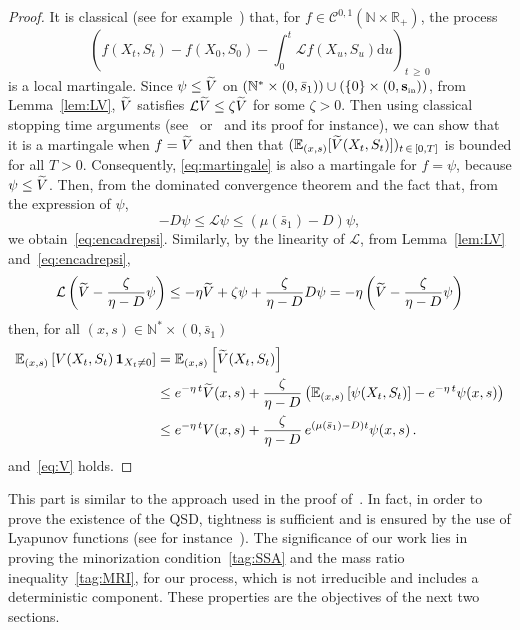\documentclass[10pt]{amsart}
\theoremstyle{definition}\newtheorem{defi}[theo]{Definition}\newtheorem{rema}[theo]{Remark}\newtheorem{exam}[theo]{Example}\newtheorem{exem}[theo]{Example}\newtheorem{nota}[theo]{Notation}
\newcommand{\RR}{\mathbb{R}}
\newcommand{\NN}{\mathbb{N}}
\newcommand{\EE}{\mathbb{E}}
\newcommand{\clL}{\mathcal{L}}
\newcommand{\clC}{\mathcal{C}}
\newcommand{\Sin}{{\mathbf s}_{\textrm{\tiny\rm in}}}
\newcommand{\dif}{\mathrm{d}}
\newcommand{\1}{\mathbf{1}}
\let\oldtilde\tilde
\renewcommand*{\tilde}[1]{\mathchoice{\widetilde{#1}}{\widetilde{#1}}{\oldtilde{#1}}{\oldtilde{#1}}}
\begin{document}
\begin{proof}
It is classical (see for example~\cite[Section~4]{CF15}) that, for $f\in\clC^{0,1}(\NN\times \RR_+)$, the process
\begin{equation}\label{eq:martingale}
\left(f(X_t,S_t) - f(X_0,S_0) - \int_0^t \clL f(X_u,S_u) \dif u \right)_{t\,\geq\,0}
\end{equation}
is a local martingale. Since $\psi \leq \tilde V$ on $(\NN^*\times(0,\bar s_1)) \cup(\{0\}\times (0,\Sin))$, from Lemma~\ref{lem:LV}, $\tilde V$ satisfies $\clL\tilde V\leq \zeta \tilde V $ for some $\zeta>0$. Then using classical stopping time arguments (see~\cite[Section~6.2.]{BCGM} or~\cite[Theorem~2.1]{MTIII} and its proof for instance), we can show that it is a martingale when $f=\tilde V$ and then that $(\EE_{(x,s)}[\tilde V(X_t,S_t)])_{t\,\in\,[0,T]}$ is bounded for all $T>0$. Consequently, \eqref{eq:martingale} is also a martingale for $f=\psi$, because $\psi \leq \tilde V$. Then, from the dominated convergence theorem and the fact that, from the expression of $\psi$,
\[
-D \psi \leq \clL \psi \leq (\mu(\bar s_1) -D)\psi,
\]
we obtain~\eqref{eq:encadrepsi}. Similarly, by the linearity of $\clL$, from Lemma~\ref{lem:LV} and~\eqref{eq:encadrepsi},
\[
\clL\left(\tilde V-\frac{\zeta}{\eta-D}\psi\right)
\leq -\eta \tilde V + \zeta \psi + \frac{\zeta}{\eta-D}D\psi = -\eta\left(\tilde V-\frac{\zeta}{\eta-D}\psi\right)
\]
then, for all $(x,s)\in \NN^*\times (0,\bar s_1)$
\begin{align*}
\EE_{(x,s)}\left[V(X_t,S_t) \, \1_{X_t\neq 0}\right] &= \EE_{(x,s)}\left[\tilde V(X_t,S_t)\right]
\\
&\leq e^{-\eta\,t}\tilde V(x,s) + \frac{\zeta}{\eta-D}\left(\EE_{(x,s)}\left[\psi(X_t,S_t)\right]-e^{-\eta\,t}\psi(x,s)\right)
\\
&\leq e^{-\eta\,t} V(x,s)+\frac{\zeta}{\eta-D}\,e^{(\mu(\bar s_1)-D) t}\psi(x,s)\,.
\end{align*}
and~\eqref{eq:V} holds.
\end{proof}


This part is similar to the approach used in the proof of~\cite[Theorem~4.1]{CMMS}. In fact, in order to prove the existence of the QSD, tightness is sufficient and is ensured by the use of Lyapunov functions (see for instance~\cite[Theorem~4.2]{CMMS2011}). The significance of our work lies in proving the minorization condition~\eqref{tag:SSA} and the mass ratio inequality~\eqref{tag:MRI}, for our process, which is not irreducible and includes a deterministic component. These properties are the objectives of the next two sections.
\end{document}
